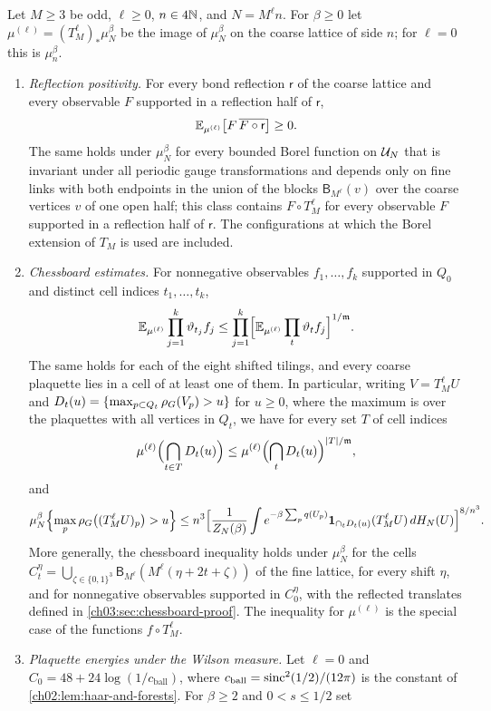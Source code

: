 \begin{theorem}\label{ch03:thm:original-chessboard}
Let $M\ge3$ be odd, $\ell\ge0$, $n\in4\mathbb N$, and $N=M^\ell n$. For $\beta\ge0$ let $\mu^{(\ell)}=(T_M^\ell)_*\mu_N^\beta$ be the image of $\mu_N^\beta$ on the coarse lattice of side $n$; for $\ell=0$ this is $\mu_n^\beta$.
\begin{enumerate}
\item\emph{Reflection positivity.} For every bond reflection $\mathsf r$ of the coarse lattice and every observable $F$ supported in a reflection half of $\mathsf r$,
\[
 \mathbb E_{\mu^{(\ell)}}\bigl[F\,\overline{F\circ\mathsf r}\bigr]\ge0.
\]
The same holds under $\mu_N^\beta$ for every bounded Borel function on $\mathcal U_{N}$ that is invariant under all periodic gauge transformations and depends only on fine links with both endpoints in the union of the blocks $\mathsf B_{M^\ell}(v)$ over the coarse vertices $v$ of one open half; this class contains $F\circ T_M^\ell$ for every observable $F$ supported in a reflection half of $\mathsf r$. The configurations at which the Borel extension of $T_M$ is used are included.
\item\emph{Chessboard estimates.} For nonnegative observables $f_1,\dots,f_k$ supported in $Q_0$ and distinct cell indices $t_1,\dots,t_k$,
\[
 \mathbb E_{\mu^{(\ell)}}\prod_{j=1}^k\vartheta_{t_j}f_j\le\prod_{j=1}^k\Bigl[\mathbb E_{\mu^{(\ell)}}\prod_t\vartheta_tf_j\Bigr]^{1/\mathfrak m}.
\]
The same holds for each of the eight shifted tilings, and every coarse plaquette lies in a cell of at least one of them. In particular, writing $V=T_M^\ell U$ and $D_t(u)=\{\max_{p\subset Q_t}\rho_G(V_p)>u\}$ for $u\ge0$, where the maximum is over the plaquettes with all vertices in $Q_t$, we have for every set $T$ of cell indices
\[
 \mu^{(\ell)}\Bigl(\bigcap_{t\in T}D_t(u)\Bigr)\le\mu^{(\ell)}\Bigl(\bigcap_tD_t(u)\Bigr)^{\lvert T\rvert/\mathfrak m},
\]
and
\[
 \mu_N^\beta\Bigl\{\max_p\rho_G\bigl((T_M^\ell U)_p\bigr)>u\Bigr\}\le n^3\Bigl[\frac{1}{Z_N(\beta)}\int e^{-\beta\sum_pq(U_p)}\mathbf 1_{\cap_tD_t(u)}(T_M^\ell U)\,dH_N(U)\Bigr]^{8/n^3}.
\]
More generally, the chessboard inequality holds under $\mu_N^\beta$ for the cells $C^\eta_t=\bigcup_{\zeta\in\{0,1\}^3}\mathsf B_{M^\ell}(M^\ell(\eta+2t+\zeta))$ of the fine lattice, for every shift $\eta$, and for nonnegative observables supported in $C^\eta_0$, with the reflected translates defined in \cref{ch03:sec:chessboard-proof}. The inequality for $\mu^{(\ell)}$ is the special case of the functions $f\circ T_M^\ell$.
\item\emph{Plaquette energies under the Wilson measure.} Let $\ell=0$ and $C_0=48+24\log(1/c_{\mathrm{ball}})$, where $c_{\mathrm{ball}}=\operatorname{sinc}^2(1/2)/(12\pi)$ is the constant of \cref{ch02:lem:haar-and-forests}. For $\beta\ge2$ and $0<s\le1/2$ set

\end{enumerate}
\end{theorem}
